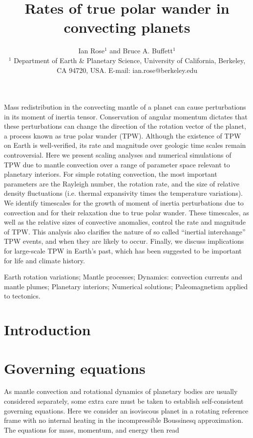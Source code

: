 \documentclass[extra]{gji}
\title[TPW Rates]
  {Rates of true polar wander in convecting planets}
\author[I. Rose and B. Buffett]
  {Ian Rose$^1$ and Bruce A. Buffett$^1$ \\
  $^1$ Department of Earth \& Planetary Science, University of California, Berkeley, CA 94720, USA.  E-mail: ian.rose@berkeley.edu
  }
\date{}
\begin{document}
\label{firstpage}

\maketitle

\begin{summary}
Mass redistribution in the convecting mantle of a planet can cause perturbations in its moment of inertia tensor. 
Conservation of angular momentum dictates that these perturbations can change the direction of the rotation vector of the planet, a process known as true polar wander (TPW). 
Although the existence of TPW on Earth is well-verified, its rate and magnitude over geologic time scales remain controversial. 
Here we present scaling analyses and numerical simulations of TPW due to mantle convection over a range of parameter space relevant to planetary interiors. 
For simple rotating convection, the most important parameters are the Rayleigh number, the rotation rate, and the size of relative density fluctuations (i.e. thermal expansivity times the temperature variations). 
We identify timescales for the growth of moment of inertia perturbations due to convection and for their relaxation due to true polar wander. 
These timescales, as well as the relative sizes of convective anomalies, control the rate and magnitude of TPW.
This analysis also clarifies the nature of so called ``inertial interchange'' TPW events, and when they are likely to occur.
Finally, we discuss implications for large-scale TPW in Earth's past, which has been suggested to be important for life and climate history.
\end{summary}

\begin{keywords}
Earth rotation variations; Mantle processes; Dynamics: convection currents and mantle plumes; Planetary interiors; Numerical solutions; Paleomagnetism applied to tectonics.
\end{keywords}

\section{Introduction}


\section{Governing equations}

As mantle convection and rotational dynamics of planetary bodies are usually considered separately, some extra care must be taken to establish self-consistent governing equations.  
Here we consider an isoviscous planet in a rotating reference frame with no internal heating in the incompressible Boussinesq approximation.  The equations for mass, momentum, and energy then read
\end{document}
